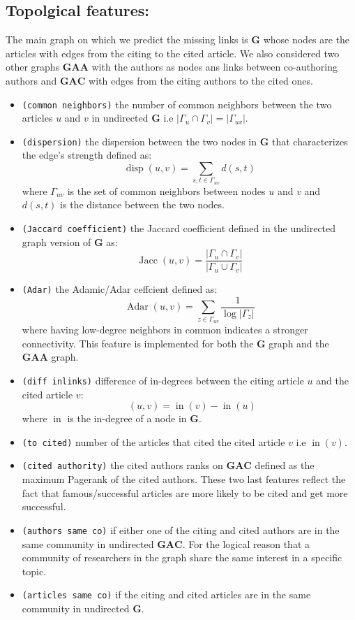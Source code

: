 \documentclass{acmsiggraph}
\DeclareMathOperator\disp{disp}
\DeclareMathOperator\Jacc{Jacc}
\DeclareMathOperator\diffin{diff_{in}}
\DeclareMathOperator\ind{in}
\DeclareMathOperator\Adar{Adar}
\newcommand{\G}{\mathbf{G}}
\newcommand{\Gac}{\mathbf{GAC}}
\newcommand{\Gaa}{\mathbf{GAA}}
\begin{document}
\subsection{Topolgical features:}
The main graph on which we predict the missing links is $\G$ whose nodes are the articles with edges from the citing to the cited article. We also considered two other graphs $\Gaa$ with the authors as nodes ans links between co-authoring authors and $\Gac$ with edges from the citing authors to the cited ones.
\begin{itemize}
\item \texttt{(common neighbors)} the number of common neighbors between the two articles $u$ and $v$ in undirected $\G$ i.e $|\Gamma_u\cap\Gamma_v|=|\Gamma_{uv}|$.
\item \texttt{(dispersion)} the dispersion between the two nodes in $\G$ that characterizes the edge's strength defined as:
\[\disp(u,v)=\sum_{s,t\in \Gamma_{uv}}d(s,t)\]
where $\Gamma_{uv}$ is the set of common neighbors between nodes $u$ and $v$ and $d(s,t)$ is the distance between the two nodes.
\item \texttt{(Jaccard coefficient)} the Jaccard coefficient defined in the undirected graph version of $\G$ as:
\[\Jacc(u,v)=\frac{|\Gamma_u\cap\Gamma_v|}{|\Gamma_u\cup\Gamma_v|}\]
\item \texttt{(Adar)} the Adamic/Adar ceffcient defined as:
\[\Adar(u,v) = \sum_{z\in\Gamma_{uv}} \frac{1}{\log|\Gamma_z|}\]
where having low-degree neighbors in common indicates a stronger connectivity. This feature is implemented for both the $\G$ graph and the $\Gaa$ graph. 
\item \texttt{(diff inlinks)} difference of in-degrees between the citing article $u$ and the cited article $v$:
\[\diffin(u,v) = \ind(v)-\ind(u)\]
where $\ind$ is the in-degree of a node in $\G$.
\item \texttt{(to cited)} number of the articles that cited the cited article $v$ i.e $\ind(v)$.
\item \texttt{(cited authority)} the cited authors ranks on $\Gac$ defined as the maximum Pagerank of the cited authors. These two last features reflect the fact that famous/successful articles are more likely to be cited and get more successful.
\item  \texttt{(authors same co)} if either one of the citing and cited authors are in the same community in undirected $\Gac$. For the logical reason that a community of researchers in the graph share the same interest in a specific topic.
\item \texttt{(articles same co)} if the citing and cited articles are in the same community in undirected $\G$.
\end{itemize}
\end{document}
